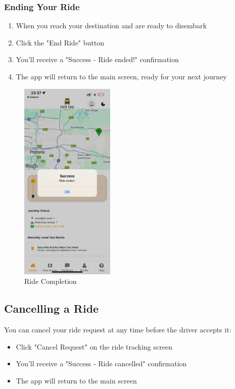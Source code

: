 \documentclass[12pt]{article}
\begin{document}
\subsubsection{Ending Your Ride}
\begin{enumerate}
    \item When you reach your destination and are ready to disembark
    \item Click the "End Ride" button
    \item You'll receive a "Success - Ride ended!" confirmation
    \item The app will return to the main screen, ready for your next journey
\end{enumerate}

\begin{figure}[H]
  \centering
  \includegraphics[width=0.4\textwidth]{ride_ended.png}
  \caption{Ride Completion}
\end{figure}

\subsection{Cancelling a Ride}

You can cancel your ride request at any time before the driver accepts it:
\begin{itemize}
    \item Click "Cancel Request" on the ride tracking screen
    \item You'll receive a "Success - Ride cancelled" confirmation
    \item The app will return to the main screen
\end{itemize}
\end{document}

